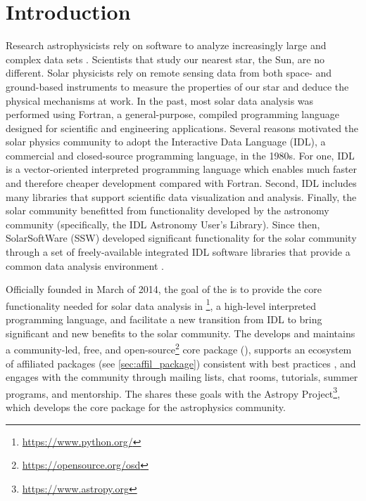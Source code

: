 \section{Introduction}
\label{sec:intro}

Research astrophysicists rely on software to analyze increasingly large and complex data sets .
Scientists that study our nearest star, the Sun, are no different.
Solar physicists rely on remote sensing data from both space- and ground-based instruments to measure the properties of our star and deduce the physical mechanisms at work.
In the past, most solar data analysis was performed using Fortran, a general-purpose, compiled programming language designed for scientific and engineering applications.
Several reasons motivated the solar physics community to adopt the Interactive Data Language (IDL), a commercial and closed-source programming language, in the 1980s.
For one, IDL is a vector-oriented interpreted programming language which enables much faster and therefore cheaper development compared with Fortran.
Second, IDL includes many libraries that support scientific data visualization and analysis.
Finally, the solar community benefitted from functionality developed by the astronomy community (specifically, the IDL Astronomy User's Library).
Since then, SolarSoftWare (SSW) developed significant functionality for the solar community through a set of freely-available integrated IDL software libraries that provide a common data analysis environment \citep{Freeland:1998we}.

Officially founded in March of 2014, the goal of the \sunpyproj is to provide the core functionality needed for solar data analysis in \python\footnote{\url{https://www.python.org/}}, a high-level interpreted  programming language, and facilitate a new transition from IDL to bring significant and new benefits to the solar community.
The \sunpyproj develops and maintains a community-led, free, and open-source\footnote{\url{https://opensource.org/osd}} core \python package (\sunpypkg), supports an ecosystem of affiliated packages (see \autoref{sec:affil_package}) consistent with best practices \citep{Wilson:2014cka}, and engages with the community through mailing lists, chat rooms, tutorials, summer programs, and mentorship.
The \sunpyproj shares these goals with the Astropy Project\footnote{\url{https://www.astropy.org}}, which develops the \astropypkg core package \citep{astropy2018} for the astrophysics community.

